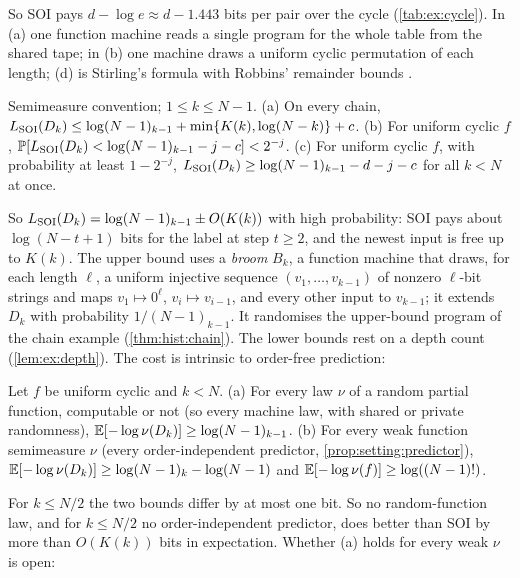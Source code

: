 So SOI pays $d-\log e\approx d-1.443$ bits per pair over the cycle (\cref{tab:ex:cycle}). In (a) one function machine reads a single program for the whole table from the shared tape; in (b) one machine draws a uniform cyclic permutation of each length; (d) is Stirling's formula with Robbins' remainder bounds \citep{robbins1955remark}.

\begin{theorem}[$k$ steps]\label{thm:ex:ksteps}
Semimeasure convention; $1\le k\le N-1$.
(a) On every chain, $L_{\mathrm{SOI}}(D_k)\le\log(N-1)_{k-1}+\min\{K(k),\log(N-k)\}+c$.
(b) For uniform cyclic $f$, $\mathbb{P}[L_{\mathrm{SOI}}(D_k)<\log(N-1)_{k-1}-j-c]<2^{-j}$.
(c) For uniform cyclic $f$, with probability at least $1-2^{-j}$, $L_{\mathrm{SOI}}(D_k)\ge\log(N-1)_{k-1}-d-j-c$ for all $k<N$ at once.
\end{theorem}

So $L_{\mathrm{SOI}}(D_k)=\log(N-1)_{k-1}\pm O(K(k))$ with high probability: SOI pays about $\log(N-t+1)$ bits for the label at step $t\ge2$, and the newest input is free up to $K(k)$. The upper bound uses a \emph{broom} $B_k$, a function machine that draws, for each length $\ell$, a uniform injective sequence $(v_1,\dots,v_{k-1})$ of nonzero $\ell$-bit strings and maps $v_1\mapsto0^\ell$, $v_i\mapsto v_{i-1}$, and every other input to $v_{k-1}$; it extends $D_k$ with probability $1/(N-1)_{k-1}$. It randomises the upper-bound program of the chain example (\cref{thm:hist:chain}). The lower bounds rest on a depth count (\cref{lem:ex:depth}). The cost is intrinsic to order-free prediction:

\begin{proposition}\label{prop:ex:orderfree}
Let $f$ be uniform cyclic and $k<N$.
(a) For every law $\nu$ of a random partial function, computable or not (so every machine law, with shared or private randomness), $\mathbb{E}[-\log\nu(D_k)]\ge\log(N-1)_{k-1}$.
(b) For every weak function semimeasure $\nu$ (every order-independent predictor, \cref{prop:setting:predictor}), $\mathbb{E}[-\log\nu(D_k)]\ge\log(N-1)_k-\log(N-1)$ and $\mathbb{E}[-\log\nu(f)]\ge\log((N-1)!)$.
\end{proposition}

For $k\le N/2$ the two bounds differ by at most one bit. So no random-function law, and for $k\le N/2$ no order-independent predictor, does better than SOI by more than $O(K(k))$ bits in expectation. Whether (a) holds for every weak $\nu$ is open:

